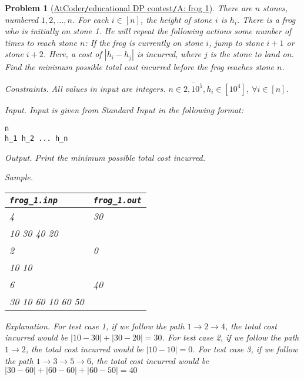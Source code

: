 \documentclass{article}
\newtheorem{problem}{Problem}
\begin{document}
\begin{problem}[\href{https://atcoder.jp/contests/dp/tasks/dp_a}{AtCoder{\tt/}educational DP contest{\tt/}A: frog 1}]
    There are $n$ stones, numbered $1,2,\ldots,n$. For each $i\in[n]$, the height of stone $i$ is $h_i$. There is a frog who is initially on stone 1. He will repeat the following actions some number of times to reach stone $n$: If the frog is currently on stone $i$, jump to stone $i + 1$ or stone $i + 2$. Here, a cost of $|h_i - h_j|$ is incurred, where $j$ is the stone to land on. Find the minimum possible total cost incurred before the frog reaches stone $n$.
    \item {\sf Constraints.} All values in input are integers. $n\in\overline{2,10^5},h_i\in[10^4]$, $\forall i\in[n]$.
    \item {\sf Input.} Input is given from Standard Input in the following format:
    \begin{verbatim}
n
h_1 h_2 ... h_n
    \end{verbatim}
    \item {\sf Output.} Print the minimum possible total cost incurred.
    \item {\sf Sample.}
    \begin{table}[H]
        \centering
        \begin{tabular}{|l|l|}
            \hline
            \verb|frog_1.inp| & \verb|frog_1.out| \\
            \hline
            4 & 30 \\
            10 30 40 20 & \\
            \hline
            2 & 0 \\
            10 10 & \\
            \hline
            6 & 40 \\
            30 10 60 10 60 50 & \\
            \hline
        \end{tabular}
    \end{table}
    \item {\sf Explanation.} For test case 1, if we follow the path $1\to2\to4$, the total cost incurred would be $|10 - 30| + |30 - 20| = 30$. For test case 2, if we follow the path $1\to2$, the total cost incurred would be $|10 - 10| = 0$. For test case 3, if we follow the path $1\to3\to5\to6$, the total cost incurred would be $|30 - 60| + |60 - 60| + |60 - 50| = 40$
\end{problem}
\end{document}
